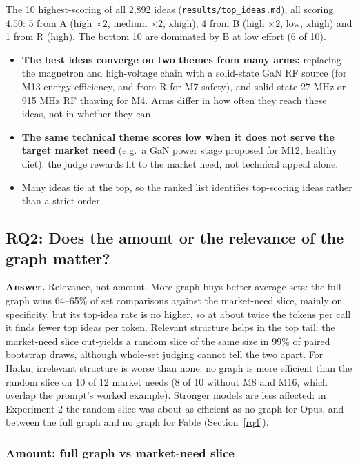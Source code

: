 The 10 highest-scoring of all 2,892 ideas (\texttt{results/top\_ideas.md}), all scoring 4.50: 5 from A (high $\times 2$, medium $\times 2$, xhigh), 4 from B (high $\times 2$, low, xhigh) and 1 from R (high). The bottom 10 are dominated by B at low effort (6 of 10).

\begin{itemize}
\tightlist
\item
  \textbf{The best ideas converge on two themes from many arms:} replacing the magnetron and high-voltage chain with a solid-state GaN RF source (for M13 energy efficiency, and from R for M7 safety), and solid-state 27 MHz or 915 MHz RF thawing for M4. Arms differ in how often they reach these ideas, not in whether they can.
\item
  \textbf{The same technical theme scores low when it does not serve the target market need} (e.g.~a GaN power stage proposed for M12, healthy diet): the judge rewards fit to the market need, not technical appeal alone.
\item
  Many ideas tie at the top, so the ranked list identifies top-scoring ideas rather than a strict order.
\end{itemize}

\hypertarget{rq2}{%
\subsection{RQ2: Does the amount or the relevance of the graph matter?}\label{rq2}}

\textbf{Answer.} Relevance, not amount. More graph buys better average sets: the full graph wins 64--65\% of set comparisons against the market-need slice, mainly on specificity, but its top-idea rate is no higher, so at about twice the tokens per call it finds fewer top ideas per token. Relevant structure helps in the top tail: the market-need slice out-yields a random slice of the same size in 99\% of paired bootstrap draws, although whole-set judging cannot tell the two apart. For Haiku, irrelevant structure is worse than none: no graph is more efficient than the random slice on 10 of 12 market needs (8 of 10 without M8 and M16, which overlap the prompt's worked example). Stronger models are less affected: in Experiment 2 the random slice was about as efficient as no graph for Opus, and between the full graph and no graph for Fable (Section~\ref{rq4}).

\hypertarget{pairwise-set-judging-full-graph-vs-market-need-slice-equal-effort}{%
\subsubsection{Amount: full graph vs market-need slice}\label{pairwise-set-judging-full-graph-vs-market-need-slice-equal-effort}}

